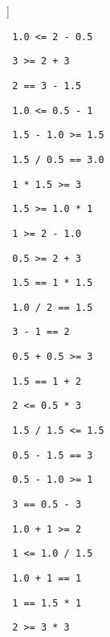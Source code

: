 \begin{exercise}
\begin{sltasks}[counter-format=2.tsk[1]]
  \task
  \begin{items}
    \item \texttt{ 1.0 <= 2 - 0.5 }
    \item \texttt{ 3 >= 2 + 3 }
    \item \texttt{ 2 == 3 - 1.5 }
    \item \texttt{ 1.0 <= 0.5 - 1 }
    \item \texttt{ 1.5 - 1.0 >= 1.5 }
  \end{items}
  \task
  \begin{items}
  \item \texttt{ 1.5 / 0.5 == 3.0 }
  \item \texttt{ 1 * 1.5 >= 3 }
  \item \texttt{ 1.5 >= 1.0 * 1 }
  \item \texttt{ 1 >= 2 - 1.0 }
  \item \texttt{ 0.5 >= 2 + 3 }
  \end{items}
  \task
  \begin{items}
  \item \texttt{ 1.5 == 1 * 1.5 }
  \item \texttt{ 1.0 / 2 == 1.5 }
  \item \texttt{ 3 - 1 == 2 }
  \item \texttt{ 0.5 + 0.5 >= 3 }
  \item \texttt{ 1.5 == 1 + 2 }
  \end{items}
  \task
  \begin{items}
  \item \texttt{ 2 <= 0.5 * 3 }
  \item \texttt{ 1.5 / 1.5 <= 1.5 }
  \item \texttt{ 0.5 - 1.5 == 3 }
  \item \texttt{ 0.5 - 1.0 >= 1 }
  \item \texttt{ 3 == 0.5 - 3 }
  \end{items}
  \task
  \begin{items}
  \item \texttt{ 1.0 + 1 >= 2 }
  \item \texttt{ 1 <= 1.0 / 1.5 }
  \item \texttt{ 1.0 + 1 == 1 }
  \item \texttt{ 1 == 1.5 * 1 }
  \item \texttt{ 2 >= 3 * 3 }
  \end{items}
\end{sltasks}
\end{exercise}

